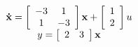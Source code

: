\[
\begin{array}{c}
 {\bf{\dot x}} = \left[ {\begin{array}{*{20}c}
   { - 3} & 1  \\
   1 & { - 3}  \\
\end{array}} \right]{\bf{x}} + \left[ {\begin{array}{*{20}c}
   1  \\
   2  \\
\end{array}} \right]u \\
 y = \left[ {\begin{array}{*{20}c}
   2 & 3  \\
\end{array}} \right]{\bf{x}} \\
 \end{array}
\]
\endinput
